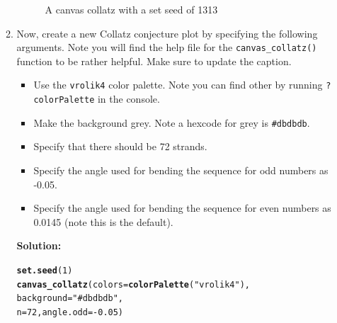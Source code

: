 \documentclass{article}\usepackage[]{graphicx}\usepackage[]{xcolor}
\makeatletter
\newcommand{\hlnum}[1]{\textcolor[rgb]{0.686,0.059,0.569}{#1}}%
\newcommand{\hlsng}[1]{\textcolor[rgb]{0.192,0.494,0.8}{#1}}%
\newcommand{\hlopt}[1]{\textcolor[rgb]{0,0,0}{#1}}%
\newcommand{\hldef}[1]{\textcolor[rgb]{0.345,0.345,0.345}{#1}}%
\newcommand{\hlkwc}[1]{\textcolor[rgb]{0.333,0.667,0.333}{#1}}%
\newcommand{\hlkwd}[1]{\textcolor[rgb]{0.737,0.353,0.396}{\textbf{#1}}}%
\newenvironment{kframe}{%
 \def\at@end@of@kframe{}%
 \ifinner\ifhmode%
  \def\at@end@of@kframe{\end{minipage}}%
  \begin{minipage}{\columnwidth}%
 \fi\fi%
 \def\FrameCommand##1{\hskip\@totalleftmargin \hskip-\fboxsep
 \colorbox{shadecolor}{##1}\hskip-\fboxsep
     \hskip-\linewidth \hskip-\@totalleftmargin \hskip\columnwidth}%
 \MakeFramed {\advance\hsize-\width
   \@totalleftmargin\z@ \linewidth\hsize
   \@setminipage}}%
 {\par\unskip\endMakeFramed%
 \at@end@of@kframe}
\newenvironment{knitrout}{}{} %
\makeatother
\begin{document}
\begin{enumerate}
\begin{enumerate}
\begin{figure}[H]
\begin{center}
\begin{knitrout}
\end{knitrout}
\caption{A canvas collatz with a set seed of 1313}
\label{CollatzPlot2}
\end{center}
\end{figure}
  \item Now, create a new Collatz conjecture plot by specifying the following 
  arguments. Note you will find the help file for the \texttt{canvas\_collatz()} 
  function to be rather helpful. Make sure to update the caption.
  \begin{itemize}
  \item Use the \texttt{vrolik4} color palette. Note you can find other by running 
  \texttt{?colorPalette} in the console.
  \item Make the background grey. Note a hexcode for grey is \texttt{\#dbdbdb}.
  \item Specify that there should be 72 strands.
  \item Specify the angle used for bending the sequence for odd numbers as -0.05.
  \item Specify the angle used for bending the sequence for even numbers as 0.0145 
  (note this is the default).
  \end{itemize}
\textbf{Solution:}
\begin{knitrout}\scriptsize
{}\color{fgcolor}\begin{kframe}
\begin{alltt}
\hlkwd{set.seed}\hldef{(}\hlnum{1}\hldef{)}
\hlkwd{canvas_collatz}\hldef{(}\hlkwc{colors} \hldef{=} \hlkwd{colorPalette}\hldef{(}\hlsng{"vrolik4"}\hldef{),}
               \hlkwc{background} \hldef{=} \hlsng{"#dbdbdb"}\hldef{,}
               \hlkwc{n}\hldef{=}\hlnum{72}\hldef{,} \hlkwc{angle.odd} \hldef{=} \hlopt{-}\hlnum{0.05}\hldef{)}
\end{alltt}
\end{kframe}
\end{knitrout}
\begin{figure}[H]
\begin{center}
\begin{knitrout}
\color{fgcolor}

\end{knitrout}
\end{center}
\end{figure}
\end{enumerate}
\end{enumerate}
\end{document}

